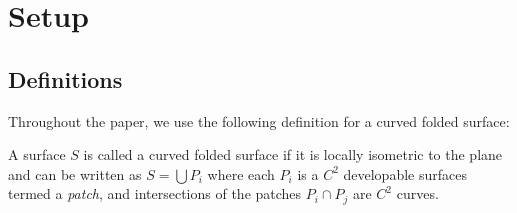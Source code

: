 
\section{Setup} \label{sec:setup}
\subsection{Definitions}
Throughout the paper, we use the following definition for a curved folded surface:
\begin{definition} \label{def:curved_folded_surface}
A surface $S$ is called a curved folded surface if it is locally isometric to the plane and can be written as $S = \bigcup P_i $ where each $P_i$ is a $C^2$ developable surfaces termed a \emph{patch}, and intersections of the patches $P_i \cap P_j$ are $C^2$ curves.
\end{definition}
